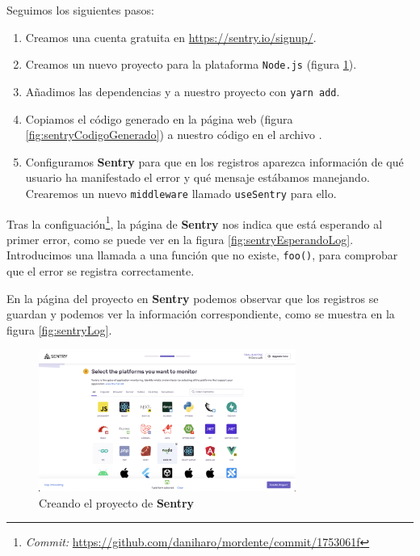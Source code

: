 Seguimos los siguientes pasos:

\begin{enumerate}
    \item Creamos una cuenta gratuita en \url{https://sentry.io/signup/}.
    \item Creamos un nuevo proyecto para la plataforma \texttt{Node.js} (figura \ref{fig:sentryCreandoProyecto}).
    \item Añadimos las dependencias  y  a nuestro proyecto con \texttt{yarn add}.
    \item Copiamos el código generado en la página web (figura \ref{fig:sentryCodigoGenerado}) a nuestro código en el archivo .
    \item Configuramos \textbf{Sentry} para que en los registros aparezca información de qué usuario ha manifestado el error y qué mensaje estábamos manejando. Crearemos un nuevo \texttt{middleware} llamado \texttt{useSentry} para ello.
\end{enumerate}

Tras la configuación\footnote{\textit{Commit:} \url{https://github.com/daniharo/mordente/commit/1753061f}}, la página de \textbf{Sentry} nos indica que está esperando al primer error, como se puede ver en la figura \ref{fig:sentryEsperandoLog}. Introducimos una llamada a una función que no existe, \texttt{foo()}, para comprobar que el error se registra correctamente.

En la página del proyecto en \textbf{Sentry} podemos observar que los registros se guardan y podemos ver la información correspondiente, como se muestra en la figura \ref{fig:sentryLog}.

\begin{figure}[h]
\centering
\includegraphics[width=0.75\textwidth]{imagenes/implementacion/sentry_creando_proyecto.png}
\caption{Creando el proyecto de \textbf{Sentry}}
\label{fig:sentryCreandoProyecto}
\end{figure}

